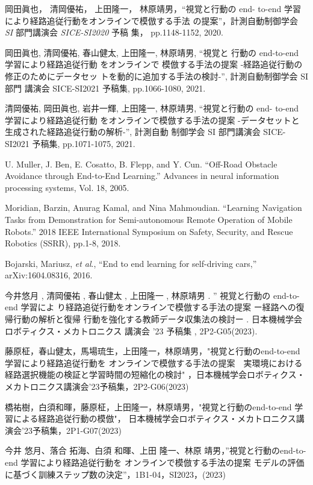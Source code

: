 \documentclass{jarticle}
\begin{document}
\footnotesize
\begin{thebibliography}{99}

岡田眞也， 清岡優祐， 上田隆一， 林原靖男，“視覚と行動の end-
to-end 学習により経路追従行動をオンラインで模倣する手法
の提案”，計測自動制御学会 \textit{SI} 部門講演会 \textit{SICE-SI2020} 予稿
集， pp.1148-1152, 2020.

岡田眞也, 清岡優祐, 春山健太, 上田隆一, 林原靖男, “視覚と
行動の end-to-end 学習により経路追従行動 をオンラインで
模倣する手法の提案 -経路追従行動の修正のためにデータセッ
トを動的に追加する手法の検討-”, 計測自動制御学会 SI 部門
講演会 SICE-SI2021 予稿集, pp.1066-1080, 2021.

清岡優祐, 岡田眞也, 岩井一輝, 上田隆一, 林原靖男, “視覚と行動の end-
to-end 学習により経路追従行動 をオンラインで模倣する手法の提案 -データセットと
生成された経路追従行動の解析-”, 計測自動 制御学会 SI 部門講演会 SICE-SI2021 
予稿集, pp.1071-1075, 2021.

U. Muller, J. Ben, E. Cosatto, B. Flepp, and Y. Cun.
“Off-Road Obstacle Avoidance through End-to-End Learning.”
Advances in neural information processing systems,
Vol. 18, 2005.

Moridian, Barzin, Anurag Kamal, and Nina Mahmoudian. 
“Learning Navigation Tasks from Demonstration for Semi-autonomous Remote
Operation of Mobile Robots.” 2018 IEEE International Symposium on
Safety, Security, and Rescue Robotics (SSRR), pp.1-8, 2018.

Bojarski, Mariusz, \textit{et al}.,
“End to end learning for self-driving cars,” arXiv:1604.08316, 2016.

今井悠月 , 清岡優祐 , 春山健太 , 上田隆一 , 林原靖男 . ” 視覚と行動の end-to-end 学習によ
り経路追従行動をオンラインで模倣する手法の提案
ー経路への復帰行動の解析と復帰
行動を強化する教師データ収集法の検討ー . 日本機械学会ロボティクス・メカトロニクス
講演会 ’23 予稿集 , 2P2-G05(2023).

藤原柾，春山健太，馬場琉生，上田隆一，林原靖男，"視覚と行動のend-to-end 学習により経路追従行動を
オンラインで模倣する手法の提案　実環境における経路選択機能の検証と学習時間の短縮化の検討"
，日本機械学会ロボティクス・メカトロニクス講演会'23予稿集，2P2-G06(2023)


橋祐樹，白須和暉，藤原柾，上田隆一，林原靖男，"視覚と行動のend-to-end 学習による経路追従行動の模倣"，
日本機械学会ロボティクス・メカトロニクス講演会'23予稿集，2P1-G07(2023)

今井 悠月、落合 拓海、白須 和暉、上田 隆一、林原 靖男，”視覚と行動のend-to-end 学習により経路追従行動を
オンラインで模倣する手法の提案 モデルの評価に基づく訓練ステップ数の決定”，1B1-04，SI2023，(2023)


\end{thebibliography}

\normalsize
\end{document}
